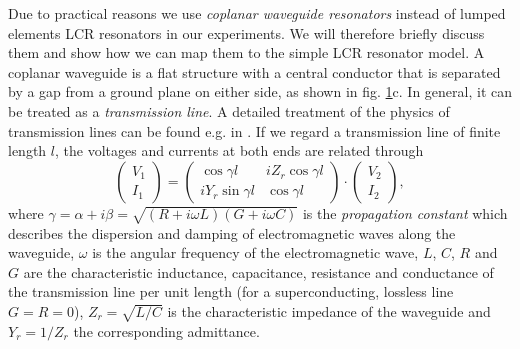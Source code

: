 \begin{figure}
	\label{fig:lambda_over_2_response}
\end{figure}

Due to practical reasons we use {\it coplanar waveguide resonators} instead of lumped elements LCR resonators in our experiments. We will therefore briefly discuss them and show how we can map them to the simple LCR resonator model. A coplanar waveguide is a flat structure with a central conductor that is separated by a gap from a ground plane on either side, as shown in fig. \ref{fig:lambda_over_2_response}c. In general, it can be treated as a {\it transmission line}. A detailed treatment of the physics of transmission lines can be found e.g. in \cite{pozar_microwave_2011}.  If we regard a transmission line of finite length $l$, the voltages and currents at both ends are related through \citep{pozar_microwave_2011}
%
\begin{equation}
\left( \begin{array}{c} V_1 \\ I_1 \end{array}\right) = \left( 
		\begin{array}{cc}
			\cos{\gamma l} & iZ_r \cos{\gamma l} \\
			i Y_r \sin{\gamma l} & \cos{\gamma l}
		\end{array}
		\right) \cdot \left(
		\begin{array}{c}
			V_2 \\ I_2
		\end{array}
		\right), \label{eq:cpw_abcd_matrix}
\end{equation}
%
where $\gamma = \alpha+i\beta = \sqrt{(R+i\omega L)(G+i\omega C)}$ is the {\it propagation constant} which describes the dispersion and damping of electromagnetic waves along the waveguide, $\omega$ is the angular frequency of the electromagnetic wave, $L$, $C$, $R$ and $G$ are the characteristic inductance, capacitance, resistance and conductance of the transmission line per unit length (for a superconducting, lossless line $G=R=0$), $Z_r=\sqrt{L/C}$ is the characteristic impedance of the waveguide and $Y_r=1/Z_r$ the corresponding admittance. 

\smallskip


